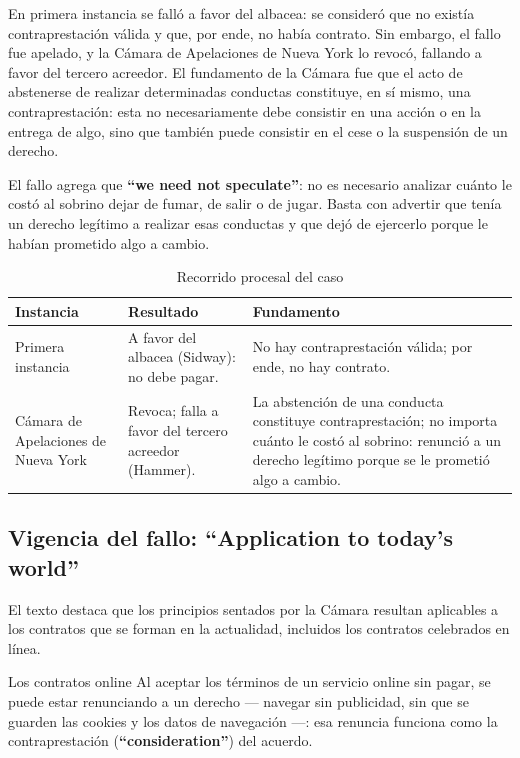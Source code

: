 \documentclass[12pt,oneside]{book}
\begin{document}
En primera instancia se falló a favor del albacea: se consideró que no existía contraprestación válida y que, por ende, no había contrato. Sin embargo, el fallo fue apelado, y la Cámara de Apelaciones de Nueva York lo revocó, fallando a favor del tercero acreedor. El fundamento de la Cámara fue que el acto de abstenerse de realizar determinadas conductas constituye, en sí mismo, una contraprestación: esta no necesariamente debe consistir en una acción o en la entrega de algo, sino que también puede consistir en el cese o la suspensión de un derecho.

El fallo agrega que \textbf{``we need not speculate''}: no es necesario analizar cuánto le costó al sobrino dejar de fumar, de salir o de jugar. Basta con advertir que tenía un derecho legítimo a realizar esas conductas y que dejó de ejercerlo porque le habían prometido algo a cambio.

\begin{table}[H]
\centering
\caption{Recorrido procesal del caso}
\begin{tabularx}{\textwidth}{
    >{\raggedright\arraybackslash}p{}
    >{\raggedright\arraybackslash}p{}
    >{\raggedright\arraybackslash}X
}
\toprule
\textbf{Instancia} & \textbf{Resultado} & \textbf{Fundamento} \\
\midrule
Primera instancia & A favor del albacea (Sidway): no debe pagar. & No hay contraprestación válida; por ende, no hay contrato. \\
Cámara de Apelaciones de Nueva York & Revoca; falla a favor del tercero acreedor (Hammer). & La abstención de una conducta constituye contraprestación; no importa cuánto le costó al sobrino: renunció a un derecho legítimo porque se le prometió algo a cambio. \\
\bottomrule
\end{tabularx}
\end{table}

\subsection{\texorpdfstring{Vigencia del fallo: ``Application to today's world''}{Vigencia del fallo: Application to today's world}}

El texto destaca que los principios sentados por la Cámara resultan aplicables a los contratos que se forman en la actualidad, incluidos los contratos celebrados en línea.

\begin{example}{Los contratos online}
Al aceptar los términos de un servicio online sin pagar, se puede estar renunciando a un derecho --- navegar sin publicidad, sin que se guarden las cookies y los datos de navegación ---: esa renuncia funciona como la contraprestación (\textbf{``consideration''}) del acuerdo.
\end{example}
\end{document}
